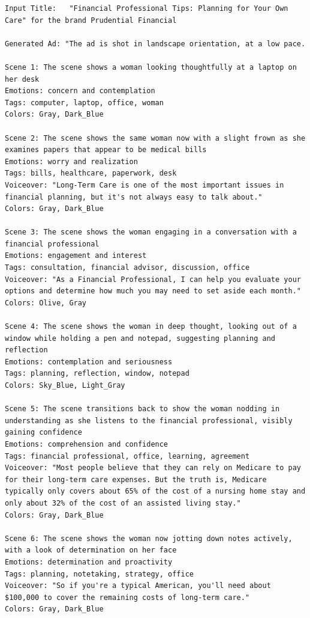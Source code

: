 \begin{lstlisting}[caption={Advertisement generated by Henry-SEED for the Pruduential Financial Ad. Original Ad: \url{https://www.youtube.com/watch?v=JPfi0P-0nwU}},frame=single,breaklines=true,basicstyle=\tiny, label={lst:Prudential-financial-ad}]
Input Title:   "Financial Professional Tips: Planning for Your Own Care" for the brand Prudential Financial

Generated Ad: "The ad is shot in landscape orientation, at a low pace. 

Scene 1: The scene shows a woman looking thoughtfully at a laptop on her desk
Emotions: concern and contemplation
Tags: computer, laptop, office, woman
Colors: Gray, Dark_Blue

Scene 2: The scene shows the same woman now with a slight frown as she examines papers that appear to be medical bills
Emotions: worry and realization
Tags: bills, healthcare, paperwork, desk
Voiceover: "Long-Term Care is one of the most important issues in financial planning, but it's not always easy to talk about."
Colors: Gray, Dark_Blue

Scene 3: The scene shows the woman engaging in a conversation with a financial professional
Emotions: engagement and interest
Tags: consultation, financial advisor, discussion, office
Voiceover: "As a Financial Professional, I can help you evaluate your options and determine how much you may need to set aside each month."
Colors: Olive, Gray

Scene 4: The scene shows the woman in deep thought, looking out of a window while holding a pen and notepad, suggesting planning and reflection
Emotions: contemplation and seriousness
Tags: planning, reflection, window, notepad
Colors: Sky_Blue, Light_Gray

Scene 5: The scene transitions back to show the woman nodding in understanding as she listens to the financial professional, visibly gaining confidence
Emotions: comprehension and confidence
Tags: financial professional, office, learning, agreement
Voiceover: "Most people believe that they can rely on Medicare to pay for their long-term care expenses. But the truth is, Medicare typically only covers about 65% of the cost of a nursing home stay and only about 32% of the cost of an assisted living stay."
Colors: Gray, Dark_Blue

Scene 6: The scene shows the woman now jotting down notes actively, with a look of determination on her face
Emotions: determination and proactivity
Tags: planning, notetaking, strategy, office
Voiceover: "So if you're a typical American, you'll need about $100,000 to cover the remaining costs of long-term care."
Colors: Gray, Dark_Blue


\end{lstlisting}
